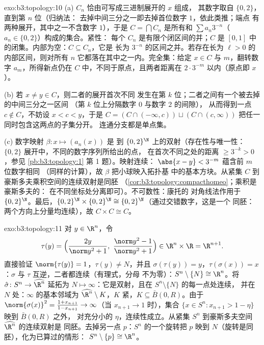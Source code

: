 \begin{solution}{exo:b3:topology:10}
(a) $C_n$ 恰由可写成三进制展开的 $x$ 组成，
其数字取自 $\{0, 2\}$，直到第 $n$ 位（归纳法：
去掉中间三分之一即去掉首位数字 $1$，依此类推；端点
有两种展开，其中之一不含数字 $1$），于是 $C = \bigcap C_n$
是所有和 $\sum a_n3^{-n}$（$a_n \in \{0,2\}$）构成的集合。紧性：
每个 $C_n$ 是有限个闭区间的并；$C$ 是
$[0,1]$ 中的闭集。内部为空：$C \subseteq C_n$，它是
长为 $3^{-n}$ 的区间之并。若存在长为
$\ell > 0$ 的内部区间，则对所有 $n$ 它都落在其中之一内。完全集：给定
$x \in C$ 与 $m$，翻转数字 $a_m$，所得新点仍在
$C$ 中，不同于原点，且两者距离在 $2\cdot3^{-m}$ 以内（原点即 $x$）。

(b) 若 $x \neq y \in C$，则二者的展开首次不同
发生在第 $k$ 位；二者之间有一个被去掉的中间三分之一区间
（第 $k$ 位上分隔数字 $0$ 与数字 $2$ 的间隙），
从而得到一点 $c \notin C$，不妨设 $x < c < y$，于是 $C =
(C \cap (-\infty, c)) \sqcup (C \cap (c, \infty))$ 把任一同时包含这两点的子集分开。
连通分支都是单点集。

(c) 数字映射 $\beta\colon x \mapsto (a_n(x))$ 是
到 $\{0,2\}^\N$ 上的双射（存在性与唯一性：
$\{0,2\}$ 展开中，不同的数字序列所给出的点，
在首次不同之处的距离 $\geq 3^{-k} > 0$，参见
\cref{pb:b3:topology:1} 第 1 题）。映射连续：
$\abs{x - y} < 3^{-m}$ 蕴含前 $m$ 位数字相同
（同样的计算），故 $\beta$ 把小球映入拓扑基
中的基本方块。从紧集 $C$ 到
豪斯多夫乘积空间的连续双射是同胚
（\cref{cor:b3:topology:compacthomeo}；乘积是豪斯多夫的：
在不同坐标处分离即可）。不可数性：康托的
对角线法作用于 $\{0,2\}^\N$。最后，$\{0,2\}^\N \times
\{0,2\}^\N \cong \{0,2\}^\N$（通过交错数字，这是一个
同胚：两个方向上分量均连续），故 $C
\times C \cong C$。
\end{solution}

\begin{solution}{exo:b3:topology:11}
对 $y \in \R^n$，令
\[
\tau(y) = \Bigl(\frac{2y}{\norm y^2 + 1},\ \frac{\norm y^2 -
1}{\norm y^2 + 1}\Bigr) \in \R^n\times\R = \R^{n+1}.
\]
直接验证 $\norm{\tau(y)} = 1$，$\tau(y) \neq N$，并且
$\sigma(\tau(y)) = y$，$\tau(\sigma(x)) = x$：$\sigma$ 与
$\tau$ 互逆，二者都连续（有理式，分母
不为零）：$S^n\setminus\{N\} \cong
\R^n$。将 $\hat\sigma \colon S^n \to \widehat{\R^n}$ 延拓为
$N \mapsto \infty$：它是双射，且在 $S^n\setminus\{N\}$ 的每一点处连续，
并在 $N$ 处：$\infty$ 的基本邻域为
$\widehat{\R^n}\setminus K$，$K$ 紧，$K
\subseteq \bar B(0, R)$。由于 $\norm{\sigma(x)}^2 = \frac{1 +
x_{n+1}}{1 - x_{n+1}} \to \infty$（当 $x_{n+1} \to 1$ 时），集合
$\{x \in S^n : x_{n+1} > 1 - \eta\}$ 映到 $\bar B(0,R)$ 之外，
对充分小的 $\eta$，连续性成立。从紧集
$S^n$ 到豪斯多夫空间 $\widehat{\R^n}$ 的连续双射是
同胚。去掉另一点 $p$：$S^n$ 的一个旋转把
$p$ 映到 $N$（旋转是同胚），化为已算过的情形：
$S^n \setminus \{p\} \cong \R^n$。
\end{solution}

